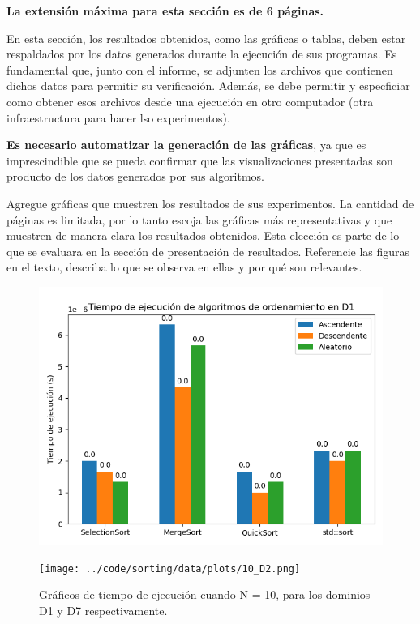\begin{mdframed}
    \textbf{La extensión máxima para esta sección es de 6 páginas.}
\end{mdframed}


En esta sección, los resultados obtenidos, como las gráficas o tablas, deben estar respaldados por los datos generados durante la ejecución de sus programas. Es fundamental que, junto con el informe, se adjunten los archivos que contienen dichos datos para permitir su verificación. Además, se debe permitir y especficiar como obtener esos archivos desde una ejecución en otro computador (otra infraestructura para hacer lso experimentos).

\textbf{Es necesario automatizar la generación de las gráficas}, ya que es imprescindible que se pueda confirmar que las visualizaciones presentadas son producto de los datos generados por sus algoritmos.

Agregue gráficas que muestren los resultados de sus experimentos. La cantidad de páginas es limitada, por lo tanto escoja las gráficas más representativas y que muestren de manera clara los resultados obtenidos. Esta elección es parte de lo que se evaluara en la sección de presentación de resultados. Referencie las figuras en el texto, describa lo que se observa en ellas y por qué son relevantes.




\begin{figure}[H]
    \centering
    \begin{minipage}[t]{0.5\textwidth}
        \includegraphics[width=\textwidth]{../code/sorting/data/plots/10_D1.png}
    \end{minipage}%
    \begin{minipage}[t]{0.5\textwidth}
        \texttt{[image: ../code/sorting/data/plots/10\_D2.png]}
     \end{minipage}%
    \caption{Gráficos de tiempo de ejecución cuando N = 10, para los dominios D1 y D7 respectivamente.}
    \label{fig:sortingN10}
\end{figure}

